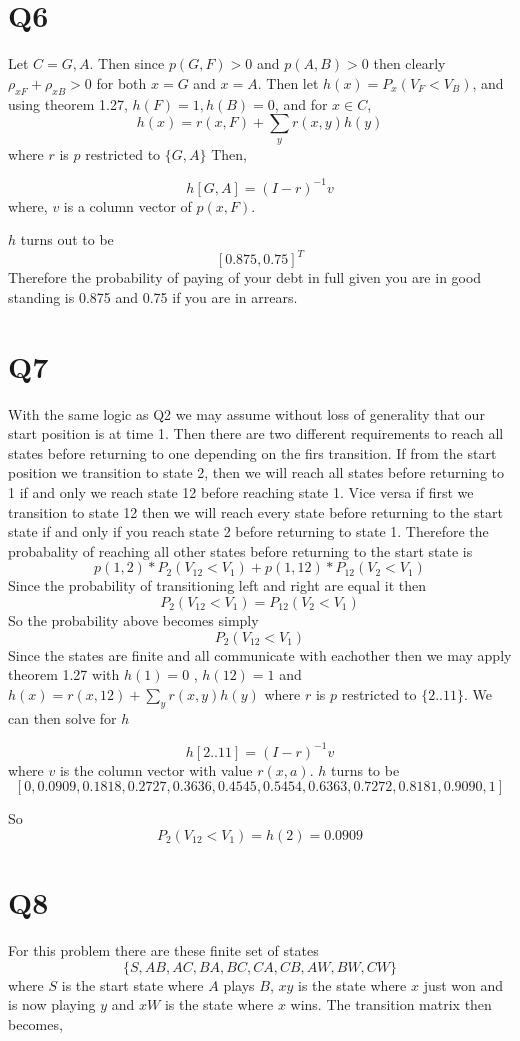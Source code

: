 \documentclass{article}
\begin{document}
\section*{Q6}
Let $C = {G,A}$. Then since $p(G,F) > 0$ and $p(A,B) > 0$ then clearly $\rho_{xF} + \rho_{xB} > 0 $ for both $x = G$ and $x= A$.
Then let $h(x) = P_x(V_F < V_B)$, and using theorem 1.27,
$h(F) = 1, h(B) = 0$, and for $x \in C$,
\[
h(x) = r(x,F) + \sum_y r(x,y)h(y)
\]
where $r$ is $p$ restricted to $\{G,A\}$
Then,

\[
h[G,A] = (I - r)^{-1}v
\]
where, $v$ is a column vector of $p(x,F)$.

$h$ turns out to be
\[
[ 0.875,  0.75 ]^T
\]
Therefore the probability of paying of your debt in full given you are in good standing is 0.875 and 0.75 if you are in arrears. 

\section*{Q7}
With the same logic as Q2 we may assume without loss of generality that our start position is at time 1. Then there are two different requirements to reach all states before returning to one depending on the firs transition. If from the start position we transition to state 2, then we will reach all states before returning to 1 if and only we reach state 12 before reaching state 1. Vice versa if first we transition to state 12 then we will reach every state before returning to the start state if and only if you reach state 2 before returning to state 1. 
Therefore the probabality of reaching all other states before returning to the start state is
\[
p(1,2)*P_2(V_12 < V_1) + p(1,12)*P_12(V_2 < V_1)
\]
Since the probability of transitioning left and right are equal it then 
\[
P_2(V_{12} < V_1) = P_12(V_2 < V_1)
\]
So the probability above becomes simply
\[
P_2(V_{12} < V_1)
\]
Since the states are finite and all communicate with eachother then we may apply theorem 1.27 with $h(1) = 0$ , $h(12) = 1$ and $h(x) = r(x,12) + \sum_y r(x,y)h(y)$ where $r$ is $p$ restricted to $\{2..11\}$. 
We can then solve for $h$

\[
h[2 .. 11] = (I -r)^{-1} v
\]
where $v$ is the column vector with value $r(x,a)$.
$h$ turns to be 
\[
[0, 0.0909,  0.1818,  0.2727,  0.3636,  0.4545,
        0.5454,  0.6363,  0.7272,  0.8181,  0.9090,1]
\]

So
\[
P_2(V_{12} < V_1) = h(2) = 0.0909
\]

\section*{Q8}
For this problem there are these finite set of states
\[
\{S, AB, AC, BA, BC, CA, CB, AW, BW, CW\}
\]
where $S$ is the start state where $A$ plays $B$, $xy$ is the state where $x$ just won and is now playing $y$ and $xW$ is the state where $x$ wins. 
The transition matrix then becomes,
\end{document}
